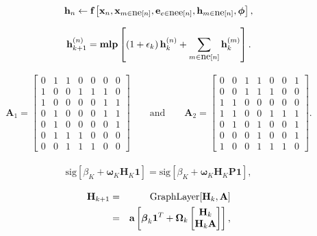 \documentclass[letterpaper,twoside,openany, titlepage,oldfontcommands,titles,dvipsnames]{memoir}
\begin{document}
\begin{eqnarray}\label{eq:gnn}
  \mathbf{h}_{n} \leftarrow \mbox{\bf f}\left[\mathbf{x}_{n},\mathbf{x}_{m\in\mbox{ne}[n]},\mathbf{e}_{e\in\mbox{nee}[n]},\mathbf{h}_{m\in\mbox{ne}[n]},\boldsymbol\phi\right],
 \end{eqnarray}

\begin{eqnarray}
  \mathbf{h}_{k+1}^{(n)} = \mbox{\bf mlp}\left[\left(1+\epsilon_{k}\right) \mathbf{h}_{k}^{(n)} +\sum_{m\in\mbox{ne}[n]}\mathbf{h}_{k}^{(m)} \right]. 
 \end{eqnarray}

\begin{eqnarray*}
 \mathbf{A}_{1} = \begin{bmatrix}
 0 & 1 & 1 & 0 & 0 & 0 & 0\\ 
 1 & 0 & 0 & 1 & 1 & 1 & 0\\
 1 & 0 & 0 & 0 & 0 & 1 & 1\\
 0 & 1 & 0 & 0 & 0 & 1 & 1\\
 0 & 1 & 0 & 0 & 0 & 0 & 1\\
 0 & 1 & 1 & 1 & 0 & 0 & 0\\
 0 & 0 & 1 & 1 & 1 & 0 & 0 
 \end{bmatrix} \quad\quad \mbox{and} \quad\quad \mathbf{A}_{2} = \begin{bmatrix}
 0 & 0 & 1 & 1 & 0 & 0 & 1 \\
 0 & 0 & 1 & 1 & 1 & 0 & 0\\
 1 & 1 & 0 & 0 & 0 & 0 & 0\\
 1 & 1 & 0 & 0 & 1 & 1 & 1\\
 0 & 1 & 0 & 1 & 0 & 0 & 1\\
 0 & 0 & 0 & 1 & 0 & 0 & 1\\
 1 & 0 & 0 & 1 & 1 & 1 & 0 
 \end{bmatrix}.
 \end{eqnarray*}

\begin{eqnarray}
 \mbox{sig}\left[\beta_{K}+\boldsymbol\omega_{K}\mathbf{H}_{K}\mathbf{1}\right] = \mbox{sig}\left[\beta_{K}+\boldsymbol\omega_{K}\mathbf{H}_{K}\mathbf{P}\mathbf{1}\right],
 \end{eqnarray}

\begin{eqnarray}
  \mathbf{H}_{k+1} &=& \mbox{GraphLayer}[\mathbf{H}_{k},\mathbf{A}] \nonumber \\
  &=& \mbox{\bf a}\left[\boldsymbol\beta_{k}\mathbf{1}^{T} + \boldsymbol\Omega_{k}\begin{bmatrix}\mathbf{H}_{k}\\ \mathbf{H}_{k}\mathbf{A} \end{bmatrix}\right],
 \end{eqnarray}
\end{document}
